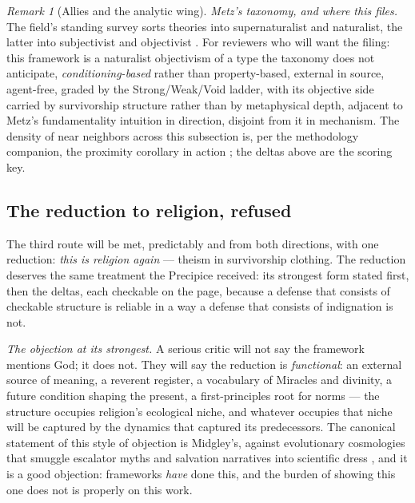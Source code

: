 \documentclass[11pt]{article}
\numberwithin{equation}{section}
\theoremstyle{plain}
\theoremstyle{definition}
\theoremstyle{remark}
\newtheorem{remark}[theorem]{Remark}
\begin{document}
\begin{remark}[Allies and the analytic wing]
\emph{Metz's taxonomy, and where this files.} The field's standing
survey sorts theories into supernaturalist and naturalist, the
latter into subjectivist and objectivist \cite{Metz13}. For
reviewers who will want the filing: this framework is a naturalist
objectivism of a type the taxonomy does not anticipate, \emph{conditioning-based} rather than property-based, external in
source, agent-free, graded by the Strong/Weak/Void ladder, with its
objective side carried by survivorship structure rather than by
metaphysical depth, adjacent to Metz's fundamentality intuition
in direction, disjoint from it in mechanism. The density of near
neighbors across this subsection is, per the methodology companion,
the proximity corollary in action \cite{Ben26Method}; the deltas
above are the scoring key.
\end{remark}

\subsection{The reduction to religion, refused}\label{gs:sub:notreligion}

The third route will be met, predictably and from both directions,
with one reduction: \emph{this is religion again} --- theism in
survivorship clothing. The reduction deserves the same treatment the
Precipice received: its strongest form stated first, then the deltas,
each checkable on the page, because a defense that consists of
checkable structure is reliable in a way a defense that consists of
indignation is not.

\emph{The objection at its strongest.} A serious critic will not say
the framework mentions God; it does not. They will say the reduction
is \emph{functional}: an external source of meaning, a reverent
register, a vocabulary of Miracles and divinity, a future condition
shaping the present, a first-principles root for norms --- the
structure occupies religion's ecological niche, and whatever occupies
that niche will be captured by the dynamics that captured its
predecessors. The canonical statement of this style of objection is
Midgley's, against evolutionary cosmologies that smuggle escalator
myths and salvation narratives into scientific dress
\cite{Midgley85}, and it is a good objection: frameworks \emph{have}
done this, and the burden of showing this one does not is properly
on this work.
\end{document}

